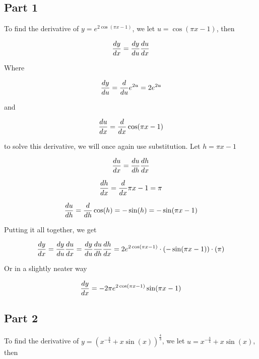 \documentclass[12pt]{article} %
\begin{document}
\begin{homeworkProblem}

    \subsection*{Part 1}

    To find the derivative of $y = e^{2\cos(\pi x - 1)}$, we let $u = \cos(\pi x - 1)$, then

    $$
        \frac{dy}{dx} = \frac{dy}{du} \frac{du}{dx}
    $$

    Where

    $$
        \frac{dy}{du} = \frac{d}{du} e^{2u} = 2e^{2u}
    $$

    and

    $$
        \frac{du}{dx} = \frac{d}{dx} \cos(\pi x - 1)
    $$

    to solve this derivative, we will once again use substitution. Let $h = \pi x - 1$

    $$
        \frac{du}{dx} = \frac{du}{dh} \frac{dh}{dx}
    $$

    $$
        \frac{dh}{dx} = \frac{d}{dx} \pi x - 1 = \pi
    $$

    $$
        \frac{du}{dh} = \frac{d}{dh} \cos(h) = - \sin(h) = - \sin(\pi x - 1)
    $$

    Putting it all together, we get

    $$
        \frac{dy}{dx} = \frac{dy}{du} \frac{du}{dx} = \frac{dy}{du} \frac{du}{dh} \frac{dh}{dx} = 2e^{2\cos(\pi x - 1)} \cdot (- \sin(\pi x - 1)) \cdot (\pi)
    $$

    Or in a slightly neater way

    $$
        \frac{dy}{dx} = -2 \pi e^{2\cos(\pi x - 1)}\sin(\pi x - 1)
    $$

    \pagebreak

    \subsection*{Part 2}

    To find the derivative of $y = (x^{-\frac{3}{4}}+ x\sin(x))^{\frac{4}{3}}$, we let $u = x^{-\frac{3}{4}}+ x\sin(x)$, then


\end{homeworkProblem}
\end{document}
